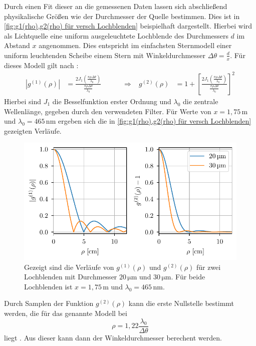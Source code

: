 Durch einen Fit dieser an die gemessenen Daten lassen sich abschließend physikalische Größen wie der Durchmesser der Quelle bestimmen. 
Dies ist in \autoref{fig:g1(rho),g2(rho) für versch Lochblenden} beispielhaft dargestellt. 
Hierbei wird als Lichtquelle eine uniform ausgeleuchtete Lochblende des Durchmessers $d$ im Abstand $x$ angenommen. 
Dies entspricht im einfachsten Sternmodell einer uniform leuchtenden Scheibe einem Stern mit Winkeldurchmesser $\Delta \theta = \frac{d}{x}$. 
Für dieses Modell gilt nach \cite[Kap. 4.1]{brownIntensityInterferometerIts1974}:
\begin{align}
    \left| g^{(1)}(\rho)\right| &= \frac{2J_1\left(\frac{\pi\rho\Delta\theta}{\lambda_0}\right)}{\frac{\pi\rho\Delta\theta}{\lambda_0}}\quad\quad\quad \Rightarrow & g^{(2)}(\rho) &= 1 + \left[\frac{2J_1\left(\frac{\pi\rho\Delta\theta}{\lambda_0}\right)}{\frac{\pi\rho\Delta\theta}{\lambda_0}}\right]^2
\end{align}
Hierbei sind $J_1$ die Besselfunktion erster Ordnung und $\lambda_0$ die zentrale Wellenlänge, gegeben durch den verwendeten Filter. 
Für Werte von $x=1{,}75\,\mathrm{m}$ und $\lambda_0=465\,\mathrm{nm}$ ergeben sich die in \autoref{fig:g1(rho),g2(rho) für versch Lochblenden} gezeigten Verläufe. 
\begin{figure}[h]
    \centering
    \includegraphics{images/Theorie/g1_g2_rho.pdf}
    \caption{Gezeigt sind die Verläufe von $g^{(1)}(\rho)$ und $g^{(2)}(\rho)$ für zwei Lochblenden mit Durchmesser $20\,\mathrm{\mu m}$ und $30\,\mathrm{\mu m}$. Für beide Lochblenden ist $x=1{,}75\,\mathrm{m}$ und $\lambda_0=465\,\mathrm{nm}$.}
    \label{fig:g1(rho),g2(rho) für versch Lochblenden}
\end{figure}
Durch Samplen der Funktion $g^{(2)}(\rho)$ kann die erste Nullstelle bestimmt werden, die für das genannte Modell bei 
\begin{equation}
    \rho=1{,}22\frac{\lambda_0}{\Delta\theta} 
    \label{eq:erste nulstelle von g2(rho) für lochblende}
\end{equation}
liegt \cite[Kap. 4.1]{brownIntensityInterferometerIts1974}. 
Aus dieser kann dann der Winkeldurchmesser berechent werden. \\



